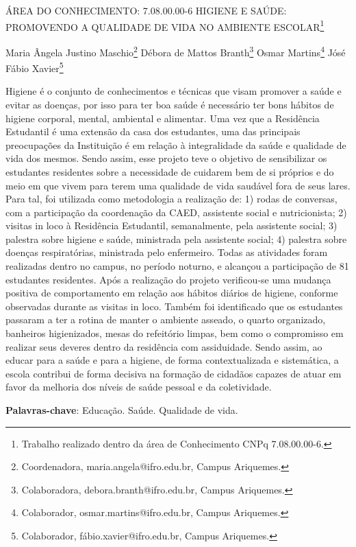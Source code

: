 \documentclass[article,12pt,onesidea,4paper,english,brazil]{abntex2}
\begin{document}
	
	
	\frenchspacing 
	
	\begin{center}
		\LARGE ÁREA DO CONHECIMENTO: 7.08.00.00-6
		HIGIENE E SAÚDE: PROMOVENDO A QUALIDADE DE VIDA NO AMBIENTE
		ESCOLAR\footnote{Trabalho realizado dentro da área de Conhecimento CNPq 7.08.00.00-6.}
		
		\normalsize
		Maria Ângela Justino Maschio\footnote{Coordenadora, maria.angela@ifro.edu.br, Campus Ariquemes.} 
		Débora de Mattos Branth\footnote{Colaboradora, debora.branth@ifro.edu.br, Campus Ariquemes.} 
		Osmar Martins\footnote{Colaborador, osmar.martins@ifro.edu.br, Campus Ariquemes.} 
	Jósé Fábio Xavier\footnote{Colaborador, fábio.xavier@ifro.edu.br, Campus Ariquemes.} 
	\end{center}
	
	\noindent Higiene é o conjunto de conhecimentos e técnicas que visam promover a saúde e
	evitar as doenças, por isso para ter boa saúde é necessário ter bons hábitos de
	higiene corporal, mental, ambiental e alimentar. Uma vez que a Residência
	Estudantil é uma extensão da casa dos estudantes, uma das principais
	preocupações da Instituição é em relação à integralidade da saúde e qualidade de
	vida dos mesmos. Sendo assim, esse projeto teve o objetivo de sensibilizar os
	estudantes residentes sobre a necessidade de cuidarem bem de si próprios e do
	meio em que vivem para terem uma qualidade de vida saudável fora de seus lares.
	Para tal, foi utilizada como metodologia a realização de: 1) rodas de conversas, com
	a participação da coordenação da CAED, assistente social e nutricionista; 2) visitas
	in loco à Residência Estudantil, semanalmente, pela assistente social; 3) palestra
	sobre higiene e saúde, ministrada pela assistente social; 4) palestra sobre doenças
	respiratórias, ministrada pelo enfermeiro. Todas as atividades foram realizadas
	dentro no campus, no período noturno, e alcançou a participação de 81 estudantes
	residentes. Após a realização do projeto verificou-se uma mudança positiva de
	comportamento em relação aos hábitos diários de higiene, conforme observadas
	durante as visitas in loco. Também foi identificado que os estudantes passaram a ter
	a rotina de manter o ambiente asseado, o quarto organizado, banheiros
	higienizados, mesas do refeitório limpas, bem como o compromisso em realizar seus
	deveres dentro da residência com assiduidade. Sendo assim, ao educar para a
	saúde e para a higiene, de forma contextualizada e sistemática, a escola contribui de
	forma decisiva na formação de cidadãos capazes de atuar em favor da melhoria dos
	níveis de saúde pessoal e da coletividade.
	
	\vspace{\onelineskip}
	
	\noindent
	\textbf{Palavras-chave}: Educação. Saúde. Qualidade de vida.
	
\end{document}
